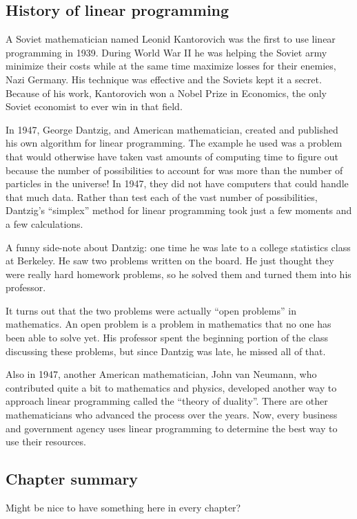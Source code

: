 \subsection{History of linear programming}
A Soviet mathematician named Leonid Kantorovich was the first to use linear programming in 1939. During World War II he was helping the Soviet army minimize their costs while at the same time maximize losses for their enemies, Nazi Germany. His technique was effective and the Soviets kept it a secret. Because of his work, Kantorovich won a Nobel Prize in Economics, the only Soviet economist to ever win in that field.

In 1947, George Dantzig, and American mathematician, created and published his own algorithm for linear programming. The example he used was a problem that would otherwise have taken vast amounts of computing time to figure out because the number of possibilities to account for was more than the number of particles in the universe! In 1947, they did not have computers that could handle that much data. Rather than test each of the vast number of possibilities, Dantzig's ``simplex'' method for linear programming took just a few moments and a few calculations.

A funny side-note about Dantzig: one time he was late to a college statistics class at Berkeley. He saw two problems written on the board. He just thought they were really hard homework problems, so he solved them and turned them into his professor.

It turns out that the two problems were actually ``open problems'' in mathematics. An open problem is a problem in mathematics that no one has been able to solve yet. His professor spent the beginning portion of the class discussing these problems, but since Dantzig was late, he missed all of that.

Also in 1947, another American mathematician, John van Neumann, who contributed quite a bit to mathematics and physics, developed another way to approach linear programming called the ``theory of duality''. There are other mathematicians who advanced the process over the years. Now, every business and government agency uses linear programming to determine the best way to use their resources.

\subsection*{Chapter summary}

Might be nice to have something here in every chapter?
